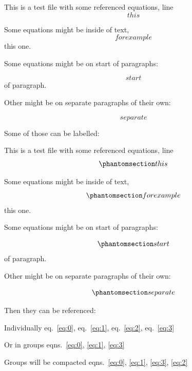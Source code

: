 This is a test file with some referenced equations, line \[this\]

Some equations might be inside of text, \[for example\] this one.

Some equations might be on start of paragraphs:

\[start\] of paragraph.

Other might be on separate paragraphs of their own:

\[separate\]

Some of those can be labelled:

This is a test file with some referenced equations, line
\begin{equation}\protect\phantomsection\label{eq:0}{this}\end{equation}

Some equations might be inside of text,
\begin{equation}\protect\phantomsection\label{eq:1}{for example}\end{equation}
this one.

Some equations might be on start of paragraphs:

\begin{equation}\protect\phantomsection\label{eq:2}{start}\end{equation}
of paragraph.

Other might be on separate paragraphs of their own:

\begin{equation}\protect\phantomsection\label{eq:3}{separate}\end{equation}

Then they can be referenced:

Individually eq.~\ref{eq:0}, eq.~\ref{eq:1}, eq.~\ref{eq:2},
eq.~\ref{eq:3}

Or in groups eqns.~\ref{eq:0}, \ref{eq:1}, \ref{eq:3}

Groups will be compacted
eqns.~\ref{eq:0}, \ref{eq:1}, \ref{eq:3}, \ref{eq:2}
